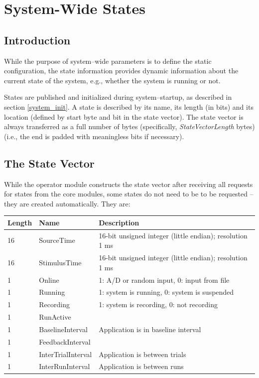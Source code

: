 \documentclass[letterpaper,oneside,12pt]{book}
\begin{document}
\section{System-Wide States}
\label{states}

\subsection{Introduction}

While the purpose of system--wide parameters is to define the static 
configuration, the state information provides dynamic information about the 
current state of the system, e.g., whether the system is running or not.

States are published and initialized during system--startup, as described in 
section \ref{system_init}. A state is described by its name, its length (in 
bits) and its location (defined by start byte and bit in the state vector). 
The state vector is always transferred as a full number of bytes (specifically, 
\textit{StateVectorLength} bytes) (i.e., the end is padded with meaningless 
bits if necessary).

\subsection{The State Vector}

While the operator module constructs the state vector after receiving 
all requests for states from the core modules, some states do not need to be
to be requested -- they are created automatically. They are:
\\[2ex]
\begin{tabular}{|l|l|l|}
 \hline
 \textbf{Length} & \textbf{Name} & \textbf{Description}\\
 \hline
 16 & SourceTime & 16-bit unsigned integer (little endian); resolution 1 ms \\  
 \hline
 16 & StimulusTime & 16-bit unsigned integer (little endian); resolution 1 ms \\  
 \hline
 1 & Online & 1: A/D or random input, 0: input from file \\  
 \hline
 1 & Running & 1: system is running, 0: system is suspended\\  
 \hline
 1 & Recording & 1: system is recording, 0: not recording\\  
 \hline
 1 & RunActive & \\  
 \hline
 1 & BaselineInterval & Application is in baseline interval\\  
 \hline
 1 & FeedbackInterval & \\  
 \hline
 1 & InterTrialInterval & Application is between trials\\ 
 \hline
 1 & InterRunInterval & Application is between runs\\ 
 \hline
\end{tabular}
\end{document}
